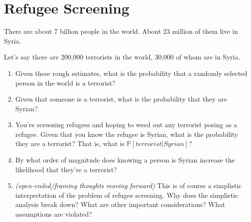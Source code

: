\documentclass{article}
\begin{document}
\section{Refugee Screening}

There are about 7 billion people in the world. About 23 million of them live in Syria.

Let's say there are 200,000 terrorists in the world, 30,000 of whom are in Syria.

\begin{enumerate}
\item Given these rough estimates, what is the probability that a randomly selected person in the world is a terrorist?
\item Given that someone is a terrorist, what is the probability that they are Syrian?
\item You're screening refugees and hoping to weed out any terrorist posing as a refugee. Given that you know the refugee is Syrian, what is the probability they are a terrorist? That is, what is $\mathbb{P}[terrorist|Syrian]$?
\item By what order of magnitude does knowing a person is Syrian increase the likelihood that they're a terrorist?
\item \textit{(open-ended/framing thoughts moving forward)} This is of course a simplistic interpretation of the problem of refugee screening. Why does the simplistic analysis break down? What are other important considerations? What assumptions are violated?
\end{enumerate}
\end{document}
